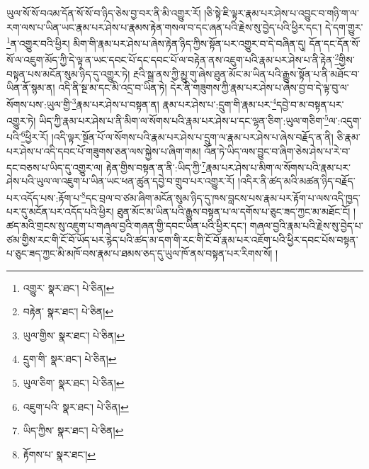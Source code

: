 ཡུལ་སོ་སོ་བའམ་དོན་སོ་སོ་བ་ཉིད་ཅེས་བྱ་བར་ནི་མི་འགྱུར་རོ། །ཅི་སྟེ་ཇི་ལྟར་རྣམ་པར་ཤེས་པ་འབྱུང་བ་གཉི་ག་ལ་རག་ལས་པ་ཡིན་ཡང་རྣམ་པར་ཤེས་པ་རྣམས་རྟེན་གསལ་བ་དང་ཞན་པའི་རྗེས་སུ་བྱེད་པའི་ཕྱིར་དང་། དེ་དག་གྱུར་\footnote{འགྱུར་  སྣར་ཐང་།  པེ་ཅིན། }ན་འགྱུར་བའི་ཕྱིར། མིག་གི་རྣམ་པར་ཤེས་པ་ཞེས་རྟེན་ཉིད་ཀྱིས་སྟོན་པར་འགྱུར་བ་དེ་བཞིན་དུ། དོན་དང་དོན་སོ་སོ་ལ་འཇུག་མོད་ཀྱི་དེ་ལྟ་ན་ཡང་དབང་པོ་དང་དབང་པོ་ལ་བརྟེན་ནས་འཇུག་པའི་རྣམ་པར་ཤེས་པ་ནི་རྟེན་\footnote{བརྟེན་  སྣར་ཐང་།  པེ་ཅིན། }གྱིས་བསྟན་པས་མངོན་སུམ་ཉིད་དུ་འགྱུར་ཏེ། རྔའི་སྒྲ་ནས་ཀྱི་མྱུ་གུ་ཞེས་ཐུན་མོང་མ་ཡིན་པའི་རྒྱུས་སྟོན་པ་ནི་མཐོང་བ་ཡིན་ནོ་སྙམ་ན། འདི་ནི་སྔ་མ་དང་མི་འདྲ་བ་ཡིན་ཏེ། དེར་ནི་གཟུགས་ཀྱི་རྣམ་པར་ཤེས་པ་ཞེས་བྱ་བ་དེ་ལྟ་བུ་ལ་སོགས་པས་:ཡུལ་གྱི་\footnote{ཡུལ་གྱིས་  སྣར་ཐང་།  པེ་ཅིན། }རྣམ་པར་ཤེས་པ་བསྟན་ན། རྣམ་པར་ཤེས་པ་:དྲུག་གི་རྣམ་པར་\footnote{དྲུག་གི་  སྣར་ཐང་།  པེ་ཅིན། }དབྱེ་བ་མ་བསྟན་པར་འགྱུར་ཏེ། ཡིད་ཀྱི་རྣམ་པར་ཤེས་པ་ནི་མིག་ལ་སོགས་པའི་རྣམ་པར་ཤེས་པ་དང་ལྷན་ཅིག་:ཡུལ་གཅིག་\footnote{ཡུལ་ཅིག་  སྣར་ཐང་།  པེ་ཅིན། }ལ་:འདུག་པའི་\footnote{འཇུག་པའི་  སྣར་ཐང་།  པེ་ཅིན། }ཕྱིར་རོ། །འདི་ལྟར་སྔོན་པོ་ལ་སོགས་པའི་རྣམ་པར་ཤེས་པ་དྲུག་ལ་རྣམ་པར་ཤེས་པ་ཞེས་བརྗོད་ན་ནི། ཅི་རྣམ་པར་ཤེས་པ་འདི་དབང་པོ་གཟུགས་ཅན་ལས་སྐྱེས་པ་ཞིག་གམ། འོན་ཏེ་ཡིད་ལས་བྱུང་བ་ཞིག་ཅེས་ཤེས་པ་རེ་བ་དང་བཅས་པ་ཡིད་དུ་འགྱུར་ལ། རྟེན་གྱིས་བསྟན་ན་ནི་:ཡིད་ཀྱི་\footnote{ཡིད་ཀྱིས་  སྣར་ཐང་།  པེ་ཅིན། }རྣམ་པར་ཤེས་པ་མིག་ལ་སོགས་པའི་རྣམ་པར་ཤེས་པའི་ཡུལ་ལ་འཇུག་པ་ཡིན་ཡང་ཕན་ཚུན་དབྱེ་བ་གྲུབ་པར་འགྱུར་རོ། །འདིར་ནི་ཚད་མའི་མཚན་ཉིད་བརྗོད་པར་འདོད་པས་:རྟོག་པ་\footnote{རྟོགས་པ་  སྣར་ཐང་། }དང་བྲལ་བ་ཙམ་ཞིག་མངོན་སུམ་ཉིད་དུ་ཁས་བླངས་པས་རྣམ་པར་རྟོག་པ་ལས་འདི་ཁྱད་པར་དུ་མངོན་པར་འདོད་པའི་ཕྱིར། ཐུན་མོང་མ་ཡིན་པའི་རྒྱུས་བསྟན་པ་ལ་དགོས་པ་ཅུང་ཟད་ཀྱང་མ་མཐོང་ངོ། །ཚད་མའི་གྲངས་སུ་འཇུག་པ་གཞལ་བྱའི་གཞན་གྱི་དབང་ཡིན་པའི་ཕྱིར་དང་། གཞལ་བྱའི་རྣམ་པའི་རྗེས་སུ་བྱེད་པ་ཙམ་གྱིས་རང་གི་ངོ་བོ་ཡོད་པར་རྙེད་པའི་ཚད་མ་དག་གི་རང་གི་ངོ་བོ་རྣམ་པར་འཇོག་པའི་ཕྱིར་དབང་པོས་བསྟན་པ་ཅུང་ཟད་ཀྱང་མི་མཁོ་བས་རྣམ་པ་ཐམས་ཅད་དུ་ཡུལ་ཁོ་ནས་བསྟན་པར་རིགས་སོ། །
